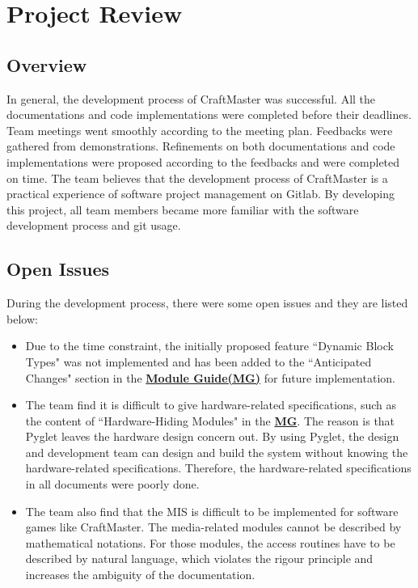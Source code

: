 \documentclass{article}
\begin{document}
\section{Project Review}
\subsection{Overview}
In general, the development process of CraftMaster was successful. All the documentations and code implementations were completed before their deadlines. Team meetings went smoothly according to the meeting plan. Feedbacks were gathered from demonstrations. Refinements on both documentations and code implementations were proposed according to the feedbacks and were completed on time. The team believes that the development process of CraftMaster is a practical experience of software project management on Gitlab. By developing this project, all team members became more familiar with the software development process and git usage. 
\subsection{Open Issues}
During the development process, there were some open issues and they are listed below:
\begin{itemize}
    \item Due to the time constraint, the initially proposed feature ``Dynamic Block Types" was not implemented and has been added to the ``Anticipated Changes" section in the \href{https://gitlab.cas.mcmaster.ca/wangs132/minecraft/-/blob/master/Doc/Design/MG/MG.pdf}{\bf Module Guide(MG)} for future implementation.
    \item The team find it is difficult to give hardware-related specifications, such as the content of ``Hardware-Hiding Modules" in the \href{https://gitlab.cas.mcmaster.ca/wangs132/minecraft/-/blob/master/Doc/Design/MG/MG.pdf}{\bf MG}. The reason is that Pyglet leaves the hardware design concern out. By using Pyglet, the design and development team can design and build the system without knowing the hardware-related specifications. Therefore, the hardware-related specifications in all documents were poorly done.
    \item The team also find that the MIS is difficult to be implemented for software games like CraftMaster. The media-related modules cannot be described by mathematical notations. For those modules, the access routines have to be described by natural language, which violates the rigour principle and increases the ambiguity of the documentation.
\end{itemize}
\end{document}
